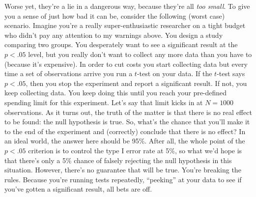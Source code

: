 \documentclass[
  a4paper,
]{book}
\begin{document}
Worse yet, they're a lie in a dangerous way, because they're all
\emph{too small}. To give you a sense of just how bad it can be,
consider the following (worst case) scenario. Imagine you're a really
super-enthusiastic researcher on a tight budget who didn't pay any
attention to my warnings above. You design a study comparing two groups.
You desperately want to see a significant result at the \(p < .05\)
level, but you really don't want to collect any more data than you have
to (because it's expensive). In order to cut costs you start collecting
data but every time a set of observations arrive you run a \(t\)-test on
your data. If the \(t\)-test says \(p < .05\), then you stop the
experiment and report a significant result. If not, you keep collecting
data. You keep doing this until you reach your pre-defined spending
limit for this experiment. Let's say that limit kicks in at \(N = 1000\)
observations. As it turns out, the truth of the matter is that there is
no real effect to be found: the null hypothesis is true. So, what's the
chance that you'll make it to the end of the experiment and (correctly)
conclude that there is no effect? In an ideal world, the answer here
should be 95\%. After all, the whole point of the \(p < .05\) criterion
is to control the type I error rate at 5\%, so what we'd hope is that
there's only a 5\% chance of falsely rejecting the null hypothesis in
this situation. However, there's no guarantee that will be true. You're
breaking the rules. Because you're running tests repeatedly, ``peeking''
at your data to see if you've gotten a significant result, all bets are
off.
\end{document}
